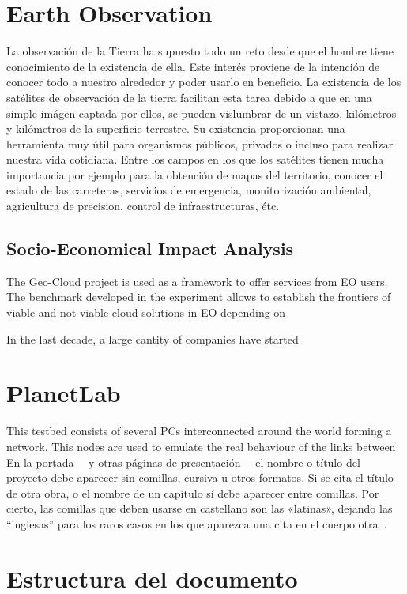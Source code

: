 \section{Earth Observation}

La observación de la Tierra ha supuesto todo un reto desde que el hombre tiene
conocimiento de la existencia de ella. Este interés proviene de la intención de
conocer todo a nuestro alrededor y poder usarlo en beneficio. 
La existencia de los satélites de observación
de la tierra facilitan esta tarea debido a que en una simple imágen captada por
ellos, se pueden vislumbrar de un vistazo, kilómetros y kilómetros de la
superficie terrestre. Su existencia proporcionan una herramienta muy útil para
organismos públicos, privados o incluso para realizar nuestra vida
cotidiana. Entre los campos en los que los satélites tienen mucha importancia
por ejemplo para la obtención de mapas del territorio, conocer el estado de las
carreteras, servicios de emergencia, monitorización ambiental, agricultura de
precision, control de infraestructuras, étc. 

\subsection{Socio-Economical Impact Analysis}

The Geo-Cloud project is used as a framework to offer services from EO
users. The benchmark developed in the experiment allows to establish the
frontiers of viable and not viable cloud solutions in EO depending on  

In the last decade, a large cantity of companies have started 
\section{PlanetLab}

This testbed consists of several PCs interconnected around the world forming a
network. This nodes are used to emulate the real behaviour of the links between
En la portada ---y otras páginas de presentación--- el nombre o título del
proyecto debe aparecer sin comillas, cursiva u otros formatos. Si se cita el
título de otra obra, o el nombre de un capítulo sí debe aparecer entre
comillas. Por cierto, las comillas que deben usarse en castellano son las
«latinas», dejando las ``inglesas'' para los raros casos en los que aparezca una
cita en el cuerpo otra~\cite{sousa}.


\section{Estructura del documento}

